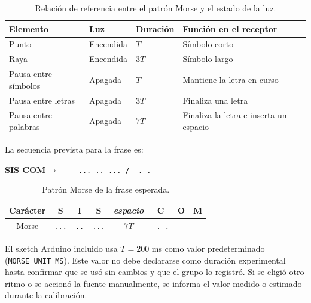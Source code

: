 \documentclass[11pt,a4paper]{article}
\begin{document}
\begin{table}[H]
\centering
\caption{Relación de referencia entre el patrón Morse y el estado de la luz.}
\label{tab:tiempos}
\begin{tabularx}{\textwidth}{l l l Y}
\toprule
Elemento & Luz & Duración & Función en el receptor\\
\midrule
Punto & Encendida & \(T\) & Símbolo corto\\
Raya & Encendida & \(3T\) & Símbolo largo\\
Pausa entre símbolos & Apagada & \(T\) & Mantiene la letra en curso\\
Pausa entre letras & Apagada & \(3T\) & Finaliza una letra\\
Pausa entre palabras & Apagada & \(7T\) & Finaliza la letra e inserta un espacio\\
\bottomrule
\end{tabularx}
\end{table}

La secuencia prevista para la frase es:

\begin{center}
\textbf{SIS COM}\qquad\(\longrightarrow\qquad\) \texttt{... .. ... / -.-. --- --}
\end{center}

\begin{table}[H]
\centering
\caption{Patrón Morse de la frase esperada.}
\label{tab:morse}
\begin{tabular}{c c c c c c c c}
\toprule
Carácter & S & I & S & \textit{espacio} & C & O & M\\
\midrule
Morse & \texttt{...} & \texttt{..} & \texttt{...} & \(7T\) & \texttt{-.-.} & \texttt{---} & \texttt{--}\\
\bottomrule
\end{tabular}
\end{table}

El sketch Arduino incluido usa \(T=200\) ms como valor predeterminado (\texttt{MORSE\_UNIT\_MS}). Este valor no debe declararse como duración experimental hasta confirmar que se usó sin cambios y que el grupo lo registró. Si se eligió otro ritmo o se accionó la fuente manualmente, se informa el valor medido o estimado durante la calibración.
\end{document}
